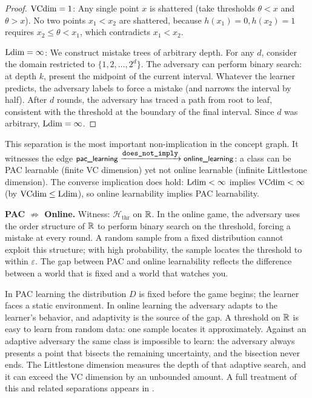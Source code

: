 \begin{proof}
$\mathrm{VCdim} = 1$: Any single point $x$ is shattered (take thresholds $\theta < x$ and $\theta > x$). No two points $x_1 < x_2$ are shattered, because $h(x_1) = 0, h(x_2) = 1$ requires $x_2 \leq \theta < x_1$, which contradicts $x_1 < x_2$.

$\mathrm{Ldim} = \infty$: We construct mistake trees of arbitrary depth. For any $d$, consider the domain restricted to $\{1, 2, \ldots, 2^d\}$. The adversary can perform binary search: at depth $k$, present the midpoint of the current interval. Whatever the learner predicts, the adversary labels to force a mistake (and narrows the interval by half). After $d$ rounds, the adversary has traced a path from root to leaf, consistent with the threshold at the boundary of the final interval. Since $d$ was arbitrary, $\mathrm{Ldim} = \infty$.
\end{proof}

This separation is the most important non-implication in the concept graph. It witnesses the edge $\nde{pac\_learning} \xrightarrow{\rel{does\_not\_imply}} \nde{online\_learning}$: a class can be PAC learnable (finite VC dimension) yet not online learnable (infinite Littlestone dimension). The converse implication does hold: $\mathrm{Ldim} < \infty$ implies $\mathrm{VCdim} < \infty$ (by $\mathrm{VCdim} \leq \mathrm{Ldim}$), so online learnability implies PAC learnability.

\begin{separation}
\textbf{PAC $\not\Rightarrow$ Online.} Witness: $\mathcal{H}_{\mathrm{thr}}$ on $\mathbb{R}$. In the online game, the adversary uses the order structure of $\mathbb{R}$ to perform binary search on the threshold, forcing a mistake at every round. A random sample from a fixed distribution cannot exploit this structure; with high probability, the sample locates the threshold to within $\varepsilon$. The gap between PAC and online learnability reflects the difference between a world that is fixed and a world that watches you.
\end{separation}

\begin{remark}
\label{rmk:gap-intuition}
In PAC learning the distribution $D$ is fixed before the game begins; the learner faces a static environment. In online learning the adversary adapts to the learner's behavior, and adaptivity is the source of the gap. A threshold on $\mathbb{R}$ is easy to learn from random data: one sample locates it approximately. Against an adaptive adversary the same class is impossible to learn: the adversary always presents a point that bisects the remaining uncertainty, and the bisection never ends. The Littlestone dimension measures the depth of that adaptive search, and it can exceed the VC dimension by an unbounded amount. A full treatment of this and related separations appears in .
\end{remark}

